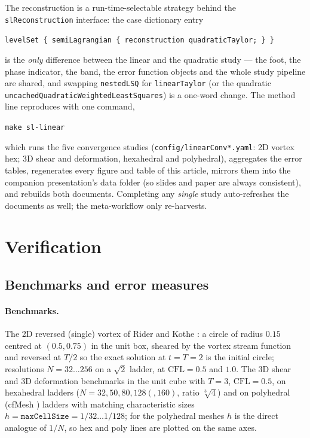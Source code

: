 \documentclass[preprint,3p,11pt]{elsarticle}
\begin{document}
The reconstruction is a run-time-selectable strategy behind the
\texttt{slReconstruction} interface: the case dictionary entry
\begin{center}
\texttt{levelSet \{ semiLagrangian \{ reconstruction quadraticTaylor; \} \}}
\end{center}
is the \emph{only} difference between the linear and the quadratic study ---
the foot, the phase indicator, the band, the error function objects and the
whole study pipeline are shared, and swapping \texttt{nestedLSQ} for
\texttt{linearTaylor} (or the quadratic \texttt{uncachedQuadraticWeighted\-Least\-Squares})
is a one-word change. The method line reproduces with one command,
\begin{center}
  \texttt{make sl-linear}
\end{center}
which runs the five convergence studies
(\texttt{config/linearConv*.yaml}: 2D vortex hex; 3D shear and deformation,
hexahedral and polyhedral), aggregates the error tables, regenerates every
figure and table of this article, mirrors them into the companion
presentation's data folder (so slides and paper are always consistent), and
rebuilds both documents. Completing any \emph{single} study auto-refreshes
the documents as well; the meta-workflow only re-harvests.

\section{Verification}
\label{sec:verification}

\subsection{Benchmarks and error measures}
\label{sec:metrics}

\paragraph{Benchmarks.} The 2D reversed (single) vortex of Rider and Kothe
\cite{rider1998}: a circle of radius $0.15$ centred at $(0.5,0.75)$ in the
unit box, sheared by the vortex stream function and reversed at $T/2$ so the
exact solution at $t=T=2$ is the initial circle; resolutions
$N = 32 \dots 256$ on a $\sqrt2$ ladder, at $\mathrm{CFL}=0.5$ and $1.0$.
The 3D shear \cite{leveque1996,liovic2006} and 3D deformation
\cite{leveque1996,enright2002} benchmarks in the unit cube with $T=3$,
$\mathrm{CFL}=0.5$, on hexahedral ladders ($N = 32,50,80,128(,160)$, ratio
$\sqrt[3]{4}$) and on polyhedral (cfMesh \cite{juretic_cfmesh}) ladders with
matching characteristic sizes $h = \texttt{maxCellSize} =
1/32 \dots 1/128$; for the polyhedral meshes $h$ is the direct analogue of
$1/N$, so hex and poly lines are plotted on the same axes.
\end{document}
